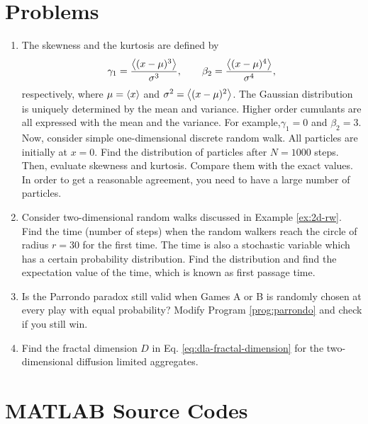 \newpage
\noindent
\section{Problems}

\begin{enumerate}[labelwidth=0.5cm,labelindent=0cm,leftmargin=*,label=\bfseries \thechapter.\arabic*,align=left]

\item
The skewness and the kurtosis are defined by
\begin{equation}
\gamma_1 = \frac{\expval{(x-\mu)^3}}{\sigma^3}, \qquad \beta_2 = \frac{\expval{(x-\mu)^4}}{\sigma^4},
\end{equation}
respectively, where $\mu=\expval{x}$ and $\sigma^2=\expval{(x-\mu)^2}$.
The Gaussian distribution is uniquely determined by the mean and variance.  Higher order cumulants are all expressed with the mean and the variance.  For example,$\gamma_1=0$ and $\beta_2=3$.
Now, consider simple one-dimensional discrete random walk.  All particles are initially at $x=0$.  Find the distribution of particles after $N=1000$ steps.  Then, evaluate skewness and kurtosis.  Compare them with the exact values.   In order to get a reasonable agreement, you need to have a large number of particles.

\item Consider two-dimensional random walks discussed in Example \ref{ex:2d-rw}.   Find the time (number of steps) when the random walkers reach the circle of radius $r=30$ for the first time.  The time is also a stochastic variable which has a certain probability distribution.  Find the distribution and find the expectation value of the time, which is known as first passage time.

\item  Is the Parrondo paradox still valid when Games A or B is randomly chosen at every play with equal probability?  Modify Program \ref{prog:parrondo} and check if you still win.

\item Find the fractal dimension $D$ in Eq. \eqref{eq:dla-fractal-dimension} for the two-dimensional diffusion limited aggregates.

\end{enumerate}


\newpage
\noindent
\section*{MATLAB Source Codes}


